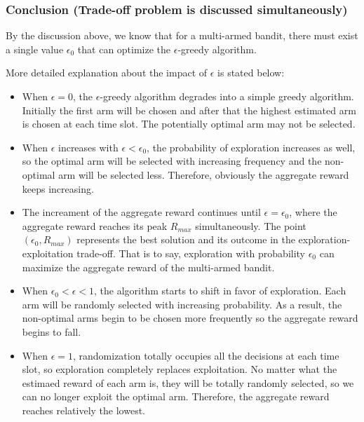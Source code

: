 \documentclass[11pt]{article}
\begin{document}
    \hypertarget{conclusion-trade-off-problem-is-discussed-simultaneously}{%
\subsubsection{Conclusion (Trade-off problem is discussed
simultaneously)}\label{conclusion-trade-off-problem-is-discussed-simultaneously}}

By the discussion above, we know that for a multi-armed bandit, there
must exist a single value \(\epsilon_0\) that can optimize the
\(\epsilon\)-greedy algorithm.

More detailed explanation about the impact of \(\epsilon\) is stated
below:

\begin{itemize}
\item
  When \(\epsilon=0\), the \(\epsilon\)-greedy algorithm degrades into a
  simple greedy algorithm. Initially the first arm will be chosen and
  after that the highest estimated arm is chosen at each time slot. The
  potentially optimal arm may not be selected.
\item
  When \(\epsilon\) increases with \(\epsilon<\epsilon_0\), the
  probability of exploration increases as well, so the optimal arm will
  be selected with increasing frequency and the non-optimal arm will be
  selected less. Therefore, obviously the aggregate reward keeps
  increasing.
\item
  The increament of the aggregate reward continues until
  \(\epsilon=\epsilon_0\), where the aggregate reward reaches its peak
  \(R_{max}\) simultaneously. The point \((\epsilon_0,R_{max})\)
  represents the best solution and its outcome in the
  exploration-exploitation trade-off. That is to say, exploration with
  probability \(\epsilon_0\) can maximize the aggregate reward of the
  multi-armed bandit.
\item
  When \(\epsilon_0<\epsilon<1\), the algorithm starts to shift in favor
  of exploration. Each arm will be randomly selected with increasing
  probability. As a result, the non-optimal arms begin to be chosen more
  frequently so the aggregate reward begins to fall.
\item
  When \(\epsilon=1\), randomization totally occupies all the decisions
  at each time slot, so exploration completely replaces exploitation. No
  matter what the estimaed reward of each arm is, they will be totally
  randomly selected, so we can no longer exploit the optimal arm.
  Therefore, the aggregate reward reaches relatively the lowest.
\end{itemize}
\end{document}
